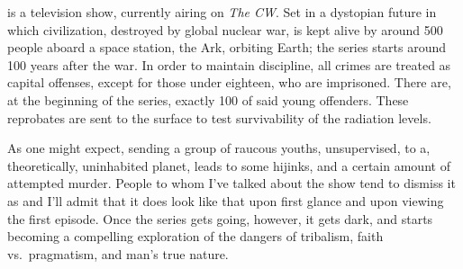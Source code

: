 \documentclass[../butidigress.tex]{subfiles}
\begin{document}
 is a television show, currently airing on \textit{The CW}.
Set in a dystopian future in which civilization, destroyed by global nuclear war, is kept alive by around 500 people aboard a space station, the Ark, orbiting Earth; the series starts around 100 years after the war.
In order to maintain discipline, all crimes are treated as capital offenses, except for those under eighteen, who are imprisoned.
There are, at the beginning of the series, exactly 100 of said young offenders.
These reprobates are sent to the surface to test survivability of the radiation levels.

As one might expect, sending a group of raucous youths, unsupervised, to a, theoretically, uninhabited planet, leads to some hijinks, and a certain amount of attempted murder.
People to whom I've talked about the show tend to dismiss it as  and I'll admit that it does look like that upon first glance and upon viewing the first episode.
Once the series gets going, however, it gets dark, and starts becoming a compelling exploration of the dangers of tribalism, faith vs.\ pragmatism, and man's true nature.
\end{document}

